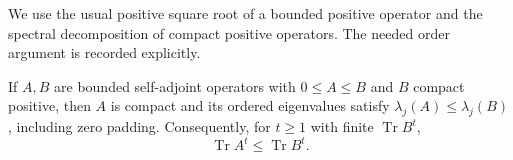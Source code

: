 We use the usual positive square root of a bounded positive operator and the
spectral decomposition of compact positive operators. The needed order argument
is recorded explicitly.

\begin{lemma}\label{L:compact-positive-order}
  If $A,B$ are bounded self-adjoint operators with $0 \le A \le B$ and $B$
  compact positive, then $A$ is compact and its ordered eigenvalues satisfy
  $\lambda_j(A) \le \lambda_j(B)$, including zero padding. Consequently, for $t
  \ge 1$ with finite $\operatorname{Tr}B^t$,
  \begin{equation}\label{E:compact-positive-trace}
    \operatorname{Tr}A^t\le\operatorname{Tr}B^t.
  \end{equation}
\end{lemma}

